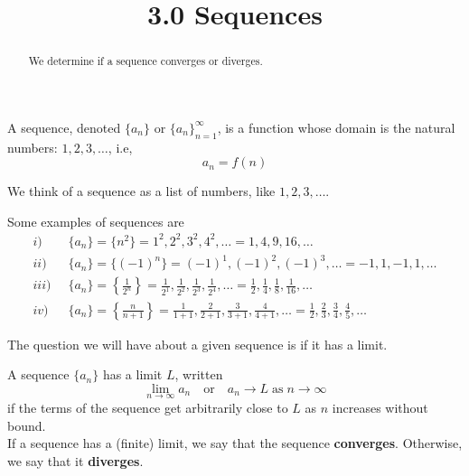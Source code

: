 \documentclass[handout]{ximera}
\title{3.0 Sequences}
\begin{document}
\begin{abstract}
We determine if a sequence converges or diverges.
\end{abstract}

\maketitle

\begin{definition}[Sequence]
A sequence, denoted $\displaystyle \{a_n\}$ or $\displaystyle \{a_n\}_{n=1}^\infty$, is a function whose domain is the natural numbers: $1, 2, 3, \dots$, i.e,
\[
a_n = f(n)
\]
\end{definition}
We think of a sequence as a list of numbers, like $1, 2, 3, \dots$.

Some examples of sequences are
\begin{align*}
i) \;\; &  \{a_n\} = \{n^2\} = 1^2, 2^2, 3^2, 4^2, \dots = 1, 4, 9, 16,  \dots\\
ii) \;\; &  \{a_n\} = \{(-1)^n\} = (-1)^1, (-1)^2, (-1)^3, \dots = -1, 1, -1, 1, \dots\\
iii) \;\; &  \{a_n\} = \left\{\frac{1}{2^n}\right\} = \frac{1}{2^1}, \frac{1}{2^2}, \frac{1}{2^3}, \frac{1}{2^4}, \dots = \frac12, \frac14, \frac18, \frac{1}{16}, \dots\\
iv) \;\; &   \{a_n\} = \left\{\frac{n}{n+1}\right\} = \frac{1}{1+1}, \frac{2}{2+1}, \frac{3}{3+1}, \frac{4}{4+1}, \dots = \frac12, \frac23, \frac34, \frac45, \dots
\end{align*}

The question we will have about a given sequence is if it has a limit.

\begin{definition}
A sequence $\{a_n\}$ has a limit $L$, written
\[
\lim_{n \to \infty} a_n \quad \mbox{or} \quad a_n \to L \; \mbox{as} \; n \to \infty
\]
if the terms of the sequence get arbitrarily close to $L$ as $n$ increases without bound.\\
If a sequence has a (finite) limit, we say that the sequence {\bf converges}.  Otherwise, we say that it {\bf diverges}.
\end{definition}
\end{document}
